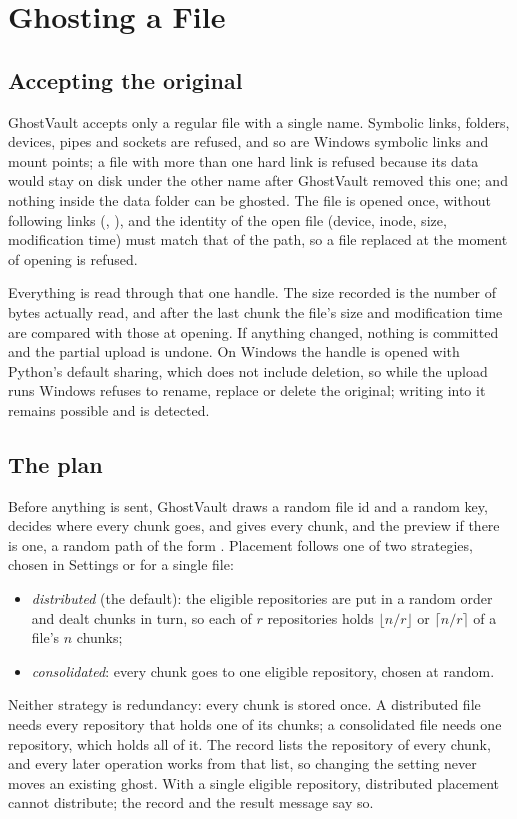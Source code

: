 \section{Ghosting a File}\label{sec:ghost}

\subsection{Accepting the original}
GhostVault accepts only a regular file with a single name. Symbolic links, folders, devices, pipes
and sockets are refused, and so are Windows symbolic links and mount points; a file with more than
one hard link is refused because its data would stay on disk under the other name after
GhostVault removed this one; and nothing inside the data folder can be ghosted. The file is opened
once, without following links (, ), and the identity of the open
file (device, inode, size, modification time) must match that of the path, so a file replaced at
the moment of opening is refused.

Everything is read through that one handle. The size recorded is the number of bytes actually read,
and after the last chunk the file's size and modification time are compared with those at opening.
If anything changed, nothing is committed and the partial upload is undone. On Windows the handle
is opened with Python's default sharing, which does not include deletion, so while the upload runs
Windows refuses to rename, replace or delete the original; writing into it remains possible and is
detected.

\subsection{The plan}
Before anything is sent, GhostVault draws a random file id and a random key, decides where every
chunk goes, and gives every chunk, and the preview if there is one, a random path of the form
. Placement follows one of two strategies, chosen in Settings
or for a single file:
\begin{itemize}
\item \emph{distributed} (the default): the eligible repositories are put in a random order and dealt
chunks in turn, so each of $r$ repositories holds $\lfloor n/r\rfloor$ or $\lceil n/r\rceil$ of a file's
$n$ chunks;
\item \emph{consolidated}: every chunk goes to one eligible repository, chosen at random.
\end{itemize}
Neither strategy is redundancy: every chunk is stored once. A distributed file needs every
repository that holds one of its chunks; a consolidated file needs one repository, which holds all
of it. The record lists the repository of every chunk, and every later operation works from that
list, so changing the setting never moves an existing ghost. With a single eligible repository,
distributed placement cannot distribute; the record and the result message say so.

